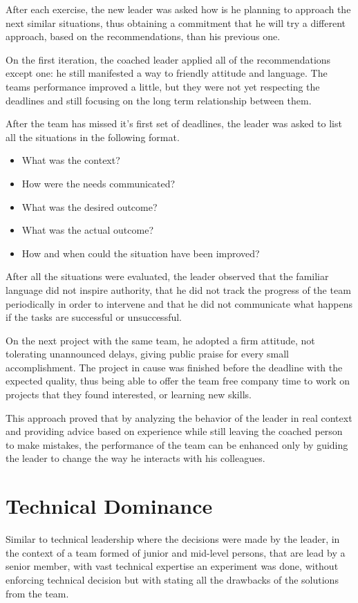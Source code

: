 After each exercise, the new leader was asked how is he planning to approach the next similar situations, thus obtaining a commitment that he will try a different approach, based on the recommendations,  than his previous one.

On the first iteration, the coached leader applied all of the recommendations except one: he still manifested a way to friendly attitude and language. The teams performance improved a little, but they were not yet respecting the deadlines and still focusing on the long term relationship between them. 

After the team has missed it's first set of deadlines, the leader was asked to list all the situations in the following format.
\begin{itemize}
\item What was the context?
\item How were the needs communicated?
\item What was the desired outcome?
\item What was the actual outcome?
\item How and when could the situation have been improved?
\end{itemize}

After all the situations were evaluated, the leader observed that 
the familiar language did not inspire authority, that he did not track the progress of the team periodically in order to intervene and that he did not communicate what happens if the tasks are successful or unsuccessful.

On the next project with the same team, he adopted a firm attitude, not tolerating unannounced delays, giving public praise for every small accomplishment. The project in cause was finished before the deadline with the expected quality, thus being able to offer the team free company time to work on projects that they found interested, or learning new skills.

This approach proved that by analyzing the behavior of the leader in real context and providing advice based on experience while still leaving the coached person to make mistakes, the performance of the team can be enhanced only by guiding the leader to change the way he interacts with his colleagues.

\section{Technical Dominance}
\label{sec:tech-dom}
Similar to technical leadership where the decisions were made by the leader, in the context of a team formed of junior and mid-level persons, that are lead by a senior member, with vast technical expertise an experiment was done, without enforcing technical decision but with stating all the drawbacks of the solutions from the team.

